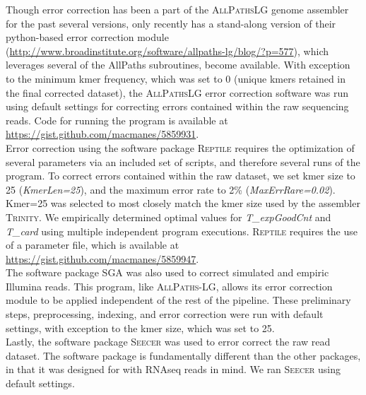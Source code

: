 \documentclass[11pt]{article}
\begin{document}
\noindent
Though error correction has been a part of the \textsc{AllPathsLG} genome assembler for the past several versions, only recently has a stand-along version of their python-based error correction module (\url{http://www.broadinstitute.org/software/allpaths-lg/blog/?p=577}), which leverages several of the AllPaths subroutines, become available.  With exception to the minimum kmer frequency, which was set to 0 (unique kmers retained in the final corrected dataset), the \textsc{AllPathsLG} error correction software was run using default settings for correcting errors contained within the raw sequencing reads.  Code for running the program is available at \url{https://gist.github.com/macmanes/5859931}.   \\

\noindent
Error correction using the software package \textsc{Reptile} requires the optimization of several parameters via an included set of scripts, and therefore several runs of the program. To correct errors contained within the raw dataset, we set kmer size to 25 (\textit{KmerLen=25}), and the maximum error rate to 2\% (\textit{MaxErrRare=0.02}). Kmer=25 was selected to most closely match the kmer size used by the assembler \textsc{Trinity}. We empirically determined optimal values for \textit{T\_expGoodCnt} and \textit{T\_card} using multiple independent program executions.  \textsc{Reptile} requires the use of a parameter file, which is available at \url{https://gist.github.com/macmanes/5859947}.   \\

\noindent
The software package \textsc{SGA} was also used to correct simulated and empiric Illumina reads. This program, like \textsc{AllPaths-LG}, allows its error correction module to be applied independent of the rest of the pipeline. These preliminary steps, preprocessing, indexing, and error correction were run with default settings, with exception to the kmer size, which was set to 25.  \\

\noindent
Lastly, the software package \textsc{Seecer} was used to error correct the raw read dataset.  The software package is fundamentally different than the other packages, in that it was designed for with RNAseq reads in mind. We ran \textsc{Seecer} using default settings.  \\
 
\end{document}
